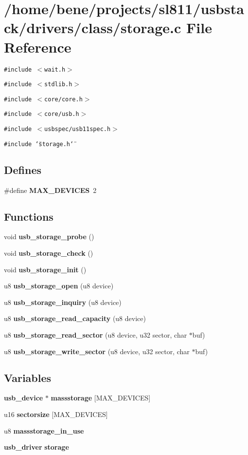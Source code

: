 \section{/home/bene/projects/sl811/usbstack/drivers/class/storage.c File Reference}
\label{storage_8c}
{\tt \#include $<$wait.h$>$}\par
{\tt \#include $<$stdlib.h$>$}\par
{\tt \#include $<$core/core.h$>$}\par
{\tt \#include $<$core/usb.h$>$}\par
{\tt \#include $<$usbspec/usb11spec.h$>$}\par
{\tt \#include \char`\"{}storage.h\char`\"{}}\par
\subsection*{Defines}
\begin{CompactItemize}
\item 
\#define {\bf MAX\_\-DEVICES}~2
\end{CompactItemize}
\subsection*{Functions}
\begin{CompactItemize}
\item 
void {\bf usb\_\-storage\_\-probe} ()
\item 
void {\bf usb\_\-storage\_\-check} ()
\item 
void {\bf usb\_\-storage\_\-init} ()
\item 
u8 {\bf usb\_\-storage\_\-open} (u8 device)
\item 
u8 {\bf usb\_\-storage\_\-inquiry} (u8 device)
\item 
u8 {\bf usb\_\-storage\_\-read\_\-capacity} (u8 device)
\item 
u8 {\bf usb\_\-storage\_\-read\_\-sector} (u8 device, u32 sector, char $\ast$buf)
\item 
u8 {\bf usb\_\-storage\_\-write\_\-sector} (u8 device, u32 sector, char $\ast$buf)
\end{CompactItemize}
\subsection*{Variables}
\begin{CompactItemize}
\item 
{\bf usb\_\-device} $\ast$ {\bf massstorage} [MAX\_\-DEVICES]
\item 
u16 {\bf sectorsize} [MAX\_\-DEVICES]
\item 
u8 {\bf massstorage\_\-in\_\-use}
\item 
{\bf usb\_\-driver} {\bf storage}
\end{CompactItemize}


